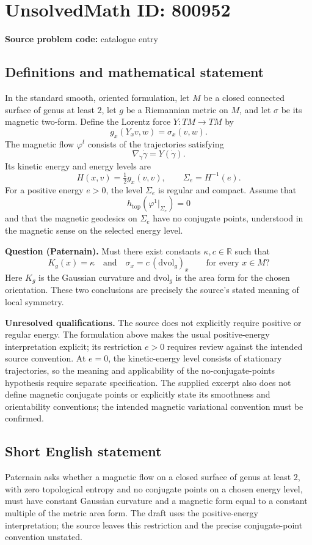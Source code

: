 \documentclass[11pt]{article}
\newcommand{\R}{\mathbb{R}}
\begin{document}
\section*{UnsolvedMath ID: 800952}
\textbf{Source problem code:} catalogue entry
\subsection{Definitions and mathematical statement}
In the standard smooth, oriented formulation, let \(M\) be a closed connected surface of genus at least \(2\), let \(g\) be a Riemannian metric on \(M\), and let \(\sigma\) be its magnetic two-form. Define the Lorentz force \(Y:TM\to TM\) by
\[
 g_x(Y_xv,w)=\sigma_x(v,w).
\]
The magnetic flow \(\varphi^t\) consists of the trajectories satisfying
\[
 \nabla_{\dot\gamma}\dot\gamma=Y(\dot\gamma).
\]
Its kinetic energy and energy levels are
\[
 H(x,v)=\tfrac12 g_x(v,v),\qquad \Sigma_e=H^{-1}(e).
\]
For a positive energy \(e>0\), the level \(\Sigma_e\) is regular and compact. Assume that
\[
 h_{\mathrm{top}}\!\left(\varphi^1|_{\Sigma_e}\right)=0
\]
and that the magnetic geodesics on \(\Sigma_e\) have no conjugate points, understood in the magnetic sense on the selected energy level.

\textbf{Question (Paternain).} Must there exist constants \(\kappa,c\in\R\) such that
\[
 K_g(x)=\kappa\quad\text{and}\quad
 \sigma_x=c\,(\mathrm{dvol}_g)_x
 \qquad\text{for every }x\in M?
\]
Here \(K_g\) is the Gaussian curvature and \(\mathrm{dvol}_g\) is the area form for the chosen orientation. These two conclusions are precisely the source's stated meaning of local symmetry.

\textbf{Unresolved qualifications.} The source does not explicitly require positive or regular energy. The formulation above makes the usual positive-energy interpretation explicit; its restriction \(e>0\) requires review against the intended source convention. At \(e=0\), the kinetic-energy level consists of stationary trajectories, so the meaning and applicability of the no-conjugate-points hypothesis require separate specification. The supplied excerpt also does not define magnetic conjugate points or explicitly state its smoothness and orientability conventions; the intended magnetic variational convention must be confirmed.
\subsection{Short English statement}
Paternain asks whether a magnetic flow on a closed surface of genus at least \(2\), with zero topological entropy and no conjugate points on a chosen energy level, must have constant Gaussian curvature and a magnetic form equal to a constant multiple of the metric area form. The draft uses the positive-energy interpretation; the source leaves this restriction and the precise conjugate-point convention unstated.
\end{document}
